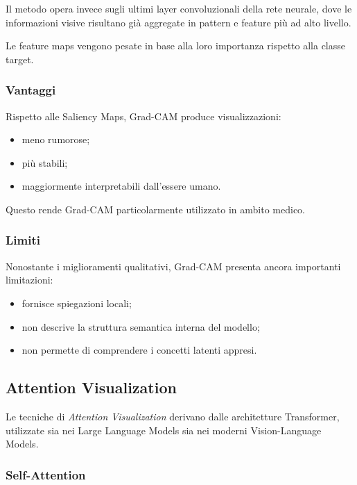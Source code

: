 Il metodo opera invece sugli ultimi layer convoluzionali della rete neurale, dove le informazioni visive risultano già aggregate in pattern e feature più ad alto livello.

Le feature maps vengono pesate in base alla loro importanza rispetto alla classe target.

\subsubsection{Vantaggi}

Rispetto alle Saliency Maps, Grad-CAM produce visualizzazioni:

\begin{itemize}
    \item meno rumorose;
    \item più stabili;
    \item maggiormente interpretabili dall'essere umano.
\end{itemize}

Questo rende Grad-CAM particolarmente utilizzato in ambito medico.

\subsubsection{Limiti}

Nonostante i miglioramenti qualitativi, Grad-CAM presenta ancora importanti limitazioni:

\begin{itemize}
    \item fornisce spiegazioni locali;
    \item non descrive la struttura semantica interna del modello;
    \item non permette di comprendere i concetti latenti appresi.
\end{itemize}

\subsection{Attention Visualization}

Le tecniche di \textit{Attention Visualization} derivano dalle architetture Transformer, utilizzate sia nei Large Language Models sia nei moderni Vision-Language Models.

\subsubsection{Self-Attention}

